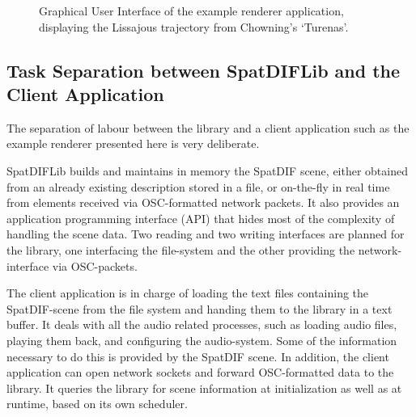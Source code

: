 \documentclass[a4paper]{article}
\begin{document}
\begin{figure}[h]
\centerline{ }
\caption{Graphical User Interface of the example renderer application, displaying the Lissajous trajectory from Chowning's `Turenas'. 
}
\label{fig:screenshot}
\end{figure}

\subsection{Task Separation between SpatDIFLib and the Client Application}

The separation of labour between the library and a client application such as the example renderer presented here is very deliberate.

SpatDIFLib builds and maintains in memory the SpatDIF scene, either obtained from an already existing description stored in a file, or on-the-fly in real time from elements received via OSC-formatted network packets.
It also provides an application programming interface (API) that hides most of the complexity of handling the scene data.
Two reading and two writing interfaces are planned for the library, one interfacing the file-system and the other providing the network-interface via OSC-packets.

The client application is in charge of loading the text files containing the SpatDIF-scene from the file system and handing them to the library in a text buffer.
It deals with all the audio related processes, such as loading audio files, playing them back, and configuring the audio-system.
Some of the information necessary to do this is provided by the SpatDIF scene.
In addition, the client application can open network sockets and forward OSC-formatted data to the library.
It queries the library for scene information at initialization as well as at runtime, based on its own scheduler.
\end{document}
